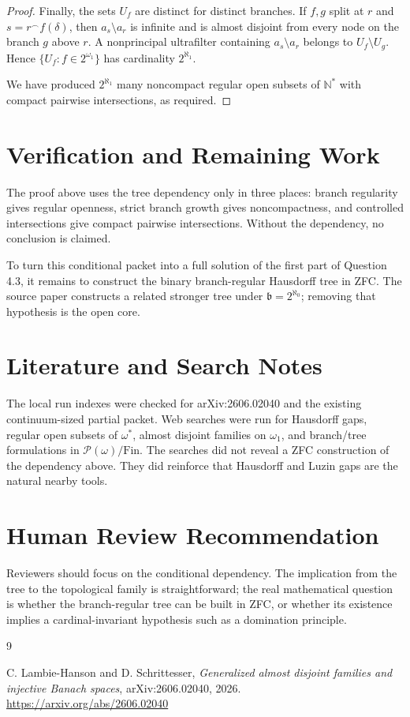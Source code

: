 \documentclass[11pt]{article}
\newcommand{\fin}{\mathrm{Fin}}
\begin{document}
\begin{proof}
Finally, the sets \(U_f\) are distinct for distinct branches. If \(f,g\) split
at \(r\) and \(s=r^\frown f(\delta)\), then
\(a_s\setminus a_r\) is infinite and is almost disjoint from every node on the
branch \(g\) above \(r\). A nonprincipal ultrafilter containing
\(a_s\setminus a_r\) belongs to \(U_f\setminus U_g\). Hence
\(\{U_f:f\in2^{\omega_1}\}\) has cardinality \(2^{\aleph_1}\).

We have produced \(2^{\aleph_1}\) many noncompact regular open subsets of
\(\mathbb N^*\) with compact pairwise intersections, as required.
\end{proof}

\section*{Verification and Remaining Work}

The proof above uses the tree dependency only in three places: branch
regularity gives regular openness, strict branch growth gives noncompactness,
and controlled intersections give compact pairwise intersections. Without the
dependency, no conclusion is claimed.

To turn this conditional packet into a full solution of the first part of
Question 4.3, it remains to construct the binary branch-regular Hausdorff tree
in ZFC. The source paper constructs a related stronger tree under
\(\mathfrak b=2^{\aleph_0}\); removing that hypothesis is the open core.

\section*{Literature and Search Notes}

The local run indexes were checked for arXiv:2606.02040 and the existing
continuum-sized partial packet. Web searches were run for Hausdorff gaps,
regular open subsets of \(\omega^*\), almost disjoint families on
\(\omega_1\), and branch/tree formulations in \(\mathcal P(\omega)/\fin\).
The searches did not reveal a ZFC construction of the dependency above. They
did reinforce that Hausdorff and Luzin gaps are the natural nearby tools.

\section*{Human Review Recommendation}

Reviewers should focus on the conditional dependency. The implication from
the tree to the topological family is straightforward; the real mathematical
question is whether the branch-regular tree can be built in ZFC, or whether
its existence implies a cardinal-invariant hypothesis such as a domination
principle.

\begin{thebibliography}{9}

C. Lambie-Hanson and D. Schrittesser,
\emph{Generalized almost disjoint families and injective Banach spaces},
arXiv:2606.02040, 2026.
\url{https://arxiv.org/abs/2606.02040}

\end{thebibliography}
\end{document}
